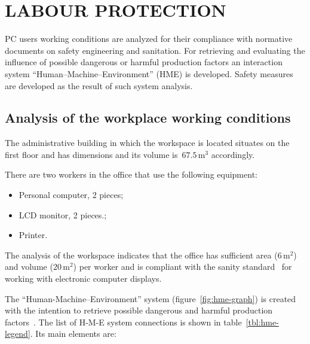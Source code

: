 
\chapter{LABOUR PROTECTION}
\label{sec:labour}

PC users working conditions are analyzed for
their compliance with normative documents on safety engineering  and
sanitation. For retrieving and evaluating the influence of possible dangerous
or harmful production factors an interaction system
``Human--Machine--Environment'' (HME) is developed. Safety measures are
developed as the result of such system analysis.

\section{Analysis of the workplace working conditions}

The administrative building in which the workspace is located situates on the
first floor and has dimensions  and
its volume is~$67.5 \, \text{m}^3$ accordingly.

There are two workers in the office that use the following equipment:
\begin{itemize}
    \item Personal computer, 2 pieces;
    \item LCD monitor, 2 pieces.;
    \item Printer.
\end{itemize}
The analysis of the workspace indicates that the office has sufficient area
($6 \, \text{m}^2$) and volume ($20 \, \text{m}^2$) per worker and is compliant
with the sanity standard~\cite{dsanpin} for working with electronic computer displays.

The ``Human-Machine--Environment'' system (figure~\ref{fig:hme-graph}) is
created with the intention to retrieve possible dangerous and harmful
production factors~\cite{npaop4-12}. The list of H-M-E system connections is
shown in table~\ref{tbl:hme-legend}. Its main elements are:

